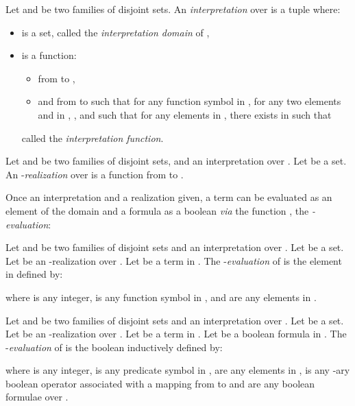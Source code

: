 \documentclass[a4paper]{llncs}
\begin{document}
  \begin{definition}[Interpretation]\label{def interpretation}
    Let  and  be two families of disjoint sets. An \emph{interpretation}  over  is a tuple  where:
    \begin{itemize}
      \item  is a set, called the \emph{interpretation domain} of ,
      \item  is a function:
        \begin{itemize}
          \item from  to ,
          \item and from  to  such that for any function symbol  in , for any two elements  and  in ,   , and such that for any  elements  in , there exists  in  such that   
        \end{itemize}
        called the \emph{interpretation function}.
    \end{itemize}
  \end{definition}
  
  \begin{definition}[Realization]
    Let  and  be two families of disjoint sets, and  an interpretation over . Let  be a set. An -\emph{realization}  over  is a function from  to .
  \end{definition}
  
  Once an interpretation  and a realization  given, a term can be evaluated as an element of the domain and a formula as a boolean \emph{via} the function , the \emph{-evaluation}:
  
  \begin{definition}
    Let  and  be two families of disjoint sets and  an interpretation over . Let  be a set. Let  be an -realization over . Let  be a term in . The -\emph{evaluation} of  is the element  in  defined by:
    
    where  is any integer,  is any function symbol in , and  are any  elements in .
  \end{definition}
  
  \begin{definition}
    Let  and  be two families of disjoint sets and  an interpretation over . Let  be a set. Let  be an -realization over . Let  be a term in . Let  be a boolean formula in . The -\emph{evaluation} of  is the boolean  inductively defined by:
  
  where  is any integer,  is any predicate symbol in ,  are any  elements in ,  is any -ary boolean operator associated with a mapping  from  to  and  are any  boolean formulae over .
  \end{definition}
  
\end{document}
